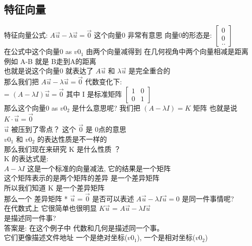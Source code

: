 \documentclass[12pt]{article}
\begin{document}
\subsection{特征向量}
\begin{flushleft}
    特征向量公式:
    $A\vec{u} - \lambda\vec{u} = \vec{0}$
    这个向量0 非常有意思
    向量0的形态是: $\begin{bmatrix}
            0 \\
            0 \\
            ..
        \end{bmatrix}$  \\
    在公式中这个向量0 as $v0_{1}$ 由两个向量减得到 在几何视角中两个向量相减是距离 例如 A-B 就是 B走到A的距离 \\
    也就是说这个向量0 就表达了 $A\vec{u}$ 和 $\lambda\vec{u}$ 是完全重合的 \\

    那么我们把 $A\vec{u} - \lambda\vec{u} = \vec{0}$ 代数变化下: \\
    = $(A - \lambda I)\vec{u} = \vec{0}$ 其中 I 是标准矩阵 $\begin{bmatrix}
            1 & 0 \\
            0 & 1
        \end{bmatrix}$ \\
    那么这个向量0 as $v0_{2}$   是什么意思呢? 我们把 $(A - \lambda I) = K$ 矩阵 也就是说 $ K \cdot \vec{u} = \vec{0}$ \\
    $\vec{u}$ 被压到了零点？ 这个 $\vec{0}$ 是 0点的意思 \\
    $v0_{1}$ 和 $v0_{2}$ 的表达性质是不一样的 \\
    那么我们现在来研究 K 是什么性质 ？ \\
    K 的表达式是:  \\
    $A - \lambda I$ 这是一个标准的向量减法, 它的结果是一个矩阵\\
    这个矩阵表示的是两个矩阵的差异 是一个差异矩阵 \\
    所以我们知道 K 是一个差异矩阵 \\
    那么一个 差异矩阵 * $\vec{u}$ = $\vec{0}$
    是否可以表述 $A\vec{u} - \lambda I\vec{u} = 0$ 是同一件事情呢? \\
    在代数式上 它很简单也很明显  $K\vec{u}$ =  $A\vec{u} - \lambda I\vec{u}$ \\
    是描述同一件事? \\
    答案是: 在这个例子中 代数和几何是描述同一个事。\\
    它们更像描述文件地址 一个是绝对坐标($v0_{1}$), 一个是相对坐标($v0_{2}$)\\


\end{flushleft}
\end{document}
